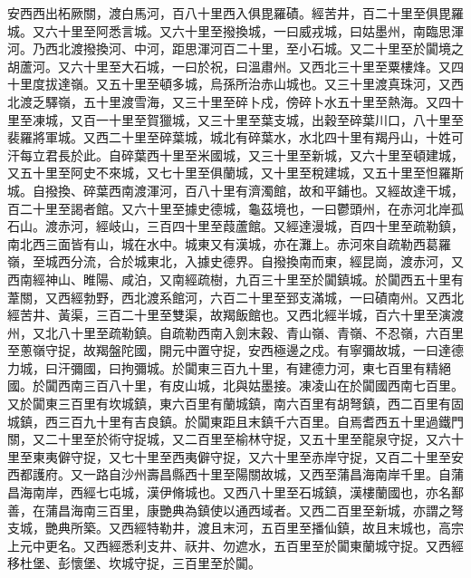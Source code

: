 \begin{pinyinscope}
 安西西出柘厥關，渡白馬河，百八十里西入俱毘羅磧。經苦井，百二十里至俱毘羅城。又六十里至阿悉言城。又六十里至撥換城，一曰威戎城，曰姑墨州，南臨思渾河。乃西北渡撥換河、中河，距思渾河百二十里，至小石城。又二十里至於闐境之胡蘆河。又六十里至大石城，一曰於祝，曰溫肅州。又西北三十里至粟樓烽。又四十里度拔達嶺。又五十里至頓多城，烏孫所治赤山城也。又三十里渡真珠河，又西北渡乏驛嶺，五十里渡雪海，又三十里至碎卜戍，傍碎卜水五十里至熱海。又四十里至凍城，又百一十里至賀獵城，又三十里至葉支城，出穀至碎葉川口，八十里至裴羅將軍城。又西二十里至碎葉城，城北有碎葉水，水北四十里有羯丹山，十姓可汗每立君長於此。自碎葉西十里至米國城，又三十里至新城，又六十里至頓建城，又五十里至阿史不來城，又七十里至俱蘭城，又十里至稅建城，又五十里至怛羅斯城。自撥換、碎葉西南渡渾河，百八十里有濟濁館，故和平鋪也。又經故達干城，百二十里至謁者館。又六十里至據史德城，龜茲境也，一曰鬱頭州，在赤河北岸孤石山。渡赤河，經岐山，三百四十里至葭蘆館。又經達漫城，百四十里至疏勒鎮，南北西三面皆有山，城在水中。城東又有漢城，亦在灘上。赤河來自疏勒西葛羅嶺，至城西分流，合於城東北，入據史德界。自撥換南而東，經昆崗，渡赤河，又西南經神山、睢陽、咸泊，又南經疏樹，九百三十里至於闐鎮城。於闐西五十里有葦關，又西經勃野，西北渡系館河，六百二十里至郅支滿城，一曰磧南州。又西北經苦井、黃渠，三百二十里至雙渠，故羯飯館也。又西北經半城，百六十里至演渡州，又北八十里至疏勒鎮。自疏勒西南入劍末穀、青山嶺、青嶺、不忍嶺，六百里至蔥嶺守捉，故羯盤陀國，開元中置守捉，安西極邊之戍。有寧彌故城，一曰達德力城，曰汗彌國，曰拘彌城。於闐東三百九十里，有建德力河，東七百里有精絕國。於闐西南三百八十里，有皮山城，北與姑墨接。凍凌山在於闐國西南七百里。又於闐東三百里有坎城鎮，東六百里有蘭城鎮，南六百里有胡弩鎮，西二百里有固城鎮，西三百九十里有吉良鎮。於闐東距且末鎮千六百里。自焉耆西五十里過鐵門關，又二十里至於術守捉城，又二百里至榆林守捉，又五十里至龍泉守捉，又六十里至東夷僻守捉，又七十里至西夷僻守捉，又六十里至赤岸守捉，又百二十里至安西都護府。又一路自沙州壽昌縣西十里至陽關故城，又西至蒲昌海南岸千里。自蒲昌海南岸，西經七屯城，漢伊脩城也。又西八十里至石城鎮，漢樓蘭國也，亦名鄯善，在蒲昌海南三百里，康艷典為鎮使以通西域者。又西二百里至新城，亦謂之弩支城，艷典所築。又西經特勒井，渡且末河，五百里至播仙鎮，故且末城也，高宗上元中更名。又西經悉利支井、祆井、勿遮水，五百里至於闐東蘭城守捉。又西經移杜堡、彭懷堡、坎城守捉，三百里至於闐。




\end{pinyinscope}
